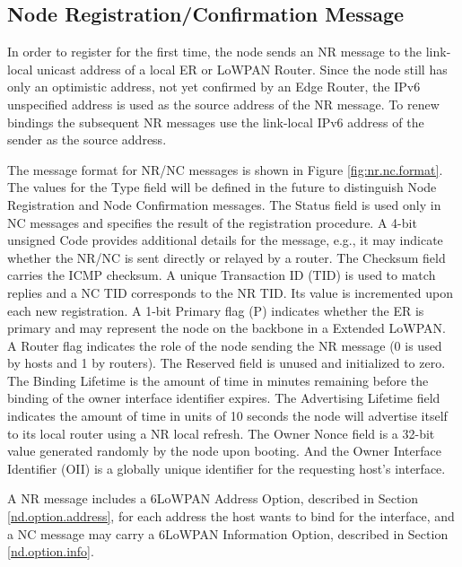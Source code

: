 \subsection{Node Registration/Confirmation Message}
In order to register for the first time, the node sends an NR message to the link-local unicast address of a local ER or LoWPAN Router. Since the node still has only an optimistic address, not yet confirmed by an Edge Router, the IPv6 unspecified address is used as the source address of the NR message. To renew bindings the subsequent NR messages use the link-local IPv6 address of the sender as the source address.

The message format for NR/NC messages is shown in Figure \ref{fig:nr.nc.format}. The values for the Type field will be defined in the future to distinguish Node Registration and Node Confirmation messages. The Status field is used only in NC messages and specifies the result of the registration procedure. A 4-bit unsigned Code provides additional details for the message, e.g., it may indicate whether the NR/NC is sent directly or relayed by a router. The Checksum field carries the ICMP checksum. A unique Transaction ID (TID) is used to match replies and a NC TID corresponds to the NR TID. Its value is incremented upon each new registration. A 1-bit Primary flag (P) indicates whether the ER is primary and may represent the node on the backbone in a Extended LoWPAN. A Router flag indicates the role of the node sending the NR message (0 is used by hosts and 1 by routers).  The Reserved field is unused and initialized to zero. The Binding Lifetime is the amount of time in minutes remaining before the binding of the owner interface identifier expires. The Advertising Lifetime field indicates the amount of time in units of 10 seconds the node will advertise itself to its local router using a NR local refresh. The Owner Nonce field is a 32-bit value generated randomly by the node upon booting.
And the Owner Interface Identifier (OII) is a globally unique identifier for the requesting host's interface.

A NR message includes a 6LoWPAN  Address Option, described in Section \ref{nd.option.address}, for each address the host wants to bind for the interface, and a NC message may carry a 6LoWPAN Information Option, described in Section \ref{nd.option.info}.

